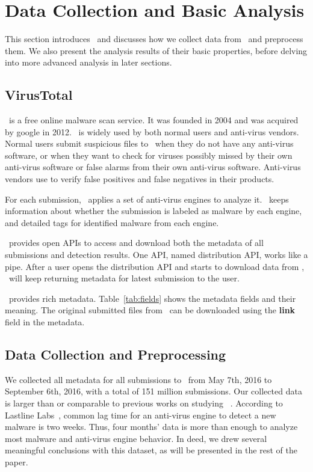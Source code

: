 \section{Data Collection and Basic Analysis}
\label{sec:meth}

This section introduces \vt\ and 
discusses how we collect data from \vt\ and preprocess them.
We also present the analysis results of their basic properties, 
before delving into more advanced analysis in later sections.


\subsection{VirusTotal}
\vt\ is a free online malware scan service.
It was founded in 2004 and was acquired by google in 2012. 
\vt\ is widely used by both normal users and anti-virus vendors.
Normal users submit suspicious files to \vt\ when they do not have any anti-virus software, 
or when they want to check for viruses possibly missed by their own anti-virus software 
or false alarms from their own anti-virus software.  
Anti-virus vendors use \vt to verify false positives and false negatives in their products.

For each submission, \vt\ applies a set of anti-virus engines to analyze it. 
\vt\ keeps information about whether the submission is labeled as malware by each engine, 
and detailed tags for identified malware from each engine. 

\vt\ provides open APIs to access and download both the metadata of all submissions and detection results.
One API, named distribution API, works like a pipe.
After a user opens the distribution API and starts to download data from \vt, 
\vt\ will keep returning metadata for latest submission to the user. 

\vt\ provides rich metadata.
Table~\ref{tab:fields} shows the metadata fields and their meaning.  
The original submitted files from \vt\ can be downloaded using the {\bf link} field in the metadata.

\subsection{Data Collection and Preprocessing}
We collected all metadata for all submissions to \vt\ from May 7th, 2016 to September 6th, 2016,
with a total of 151 million submissions. 
Our collected data is larger than or comparable to previous works on studying \vt~\cite{SongAPsys2016,huangvt2016bigdata}.
According to Lastline Labs~\cite{Lastline}, common lag time for an anti-virus engine to detect a new malware is two weeks.
Thus, four months' data is more than enough to analyze most malware and anti-virus engine behavior. 
In deed, we drew several meaningful conclusions with this dataset, as will be presented in the rest of the paper.

